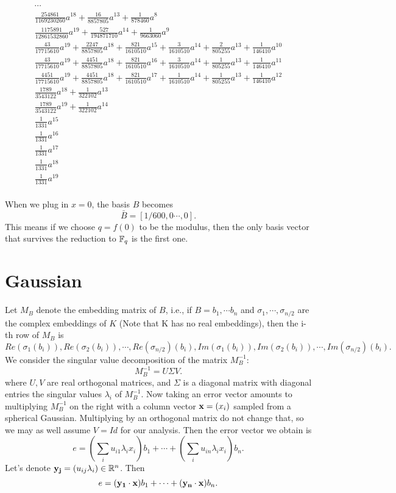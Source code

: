 \documentclass{amsart}
\begin{document}
\begin{align*}
\cdots \\
\frac{254861}{1169230260} a^{18} + \frac{16}{8857805} a^{13} + \frac{1}{878460} a^{8} \\
\frac{1175891}{12861532860} a^{19} + \frac{527}{194871710} a^{14} + \frac{1}{9663060} a^{9} \\
\frac{43}{17715610} a^{19} + \frac{2247}{8857805} a^{18} + \frac{821}{1610510} a^{15} + \frac{3}{1610510} a^{14} + \frac{2}{805255} a^{13} + \frac{1}{146410} a^{10} \\
\frac{43}{17715610} a^{19} + \frac{4451}{8857805} a^{18} + \frac{821}{1610510} a^{16} + \frac{3}{1610510} a^{14} + \frac{1}{805255} a^{13} + \frac{1}{146410} a^{11} \\
\frac{4451}{17715610} a^{19} + \frac{4451}{8857805} a^{18} + \frac{821}{1610510} a^{17} + \frac{1}{1610510} a^{14} + \frac{1}{805255} a^{13} + \frac{1}{146410} a^{12} \\
\frac{1789}{3543122} a^{18} + \frac{1}{322102} a^{13} \\
\frac{1789}{3543122} a^{19} + \frac{1}{322102} a^{14} \\
\frac{1}{1331} a^{15} \\
\frac{1}{1331} a^{16} \\
\frac{1}{1331} a^{17} \\
\frac{1}{1331} a^{18} \\
\frac{1}{1331} a^{19} \\
\end{align*}

When we plug in $x = 0$, the basis $B$ becomes
\[
  \bar{B} =  [1/600, 0 \cdots, 0].
\]
This means if we choose $q = f(0)$ to be the modulus, then the only basis vector that survives the reduction to $\mathbb{F}_q$
is the first one.

\section{Gaussian}

Let $M_B$ denote the embedding matrix of $B$, i.e., if
$B = b_1 ,\cdots b_n$ and $\sigma_1,\cdots, \sigma_{n/2}$ are
the complex embeddings of $K$ (Note that K has no real embeddings), then the i-th row of $M_B$ is
\[
Re(\sigma_1(b_i)), Re(\sigma_2(b_i)), \cdots, Re(\sigma_{n/2})(b_i),Im(\sigma_1(b_i)), Im(\sigma_2(b_i)), \cdots, Im(\sigma_{n/2})(b_i).
\]
We consider the singular value decomposition of the matrix $M_B^{-1}$:
\[
M_B^{-1} = U \Sigma V.
\]
where $U,V$ are real orthogonal matrices, and $\Sigma$ is a diagonal matrix with diagonal entries the singular values $\lambda_i$ of $M_B^{-1}$. Now taking an error vector amounts to multiplying $M_B^{-1}$ on the right with a column vector ${\bf x} = (x_i)$ sampled from a spherical Gaussian. Multiplying by an orthogonal matrix do not change that, so we may as well assume $V = Id$ for our analysis. Then the error vector we obtain is
\[
    e = \left(\sum_{i} u_{i1}\lambda_i x_i\right)b_1 + \cdots + \left(\sum_{i} u_{in}\lambda_i x_i\right)b_n.
\]
Let's denote ${\bf y_j} = (u_{ij} \lambda_i) \in \mathbb{R}^n$. Then
\[
    e = ({\bf y_1} \cdot {\bf x}) b_1 + \cdots + ({\bf y_n} \cdot {\bf x}) b_n.
\]
\end{document}
